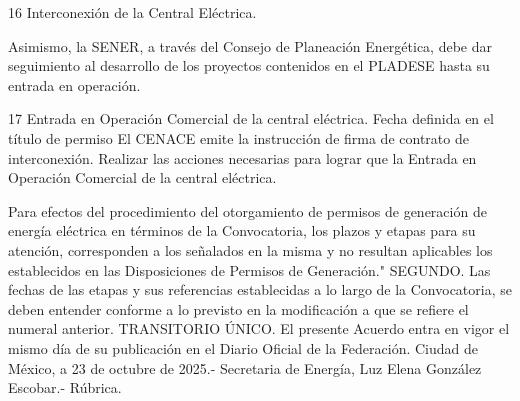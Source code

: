  16
 Interconexión de la Central Eléctrica.
 
 Asimismo, la SENER, a través del Consejo de Planeación Energética, debe dar seguimiento al desarrollo de los proyectos contenidos en el PLADESE hasta su entrada en operación.
 
 
 17
 Entrada en Operación Comercial de la central eléctrica.
 Fecha definida en el título de permiso
 El CENACE emite la instrucción de firma de contrato de interconexión.
 Realizar las acciones necesarias para lograr que la Entrada en Operación Comercial de la central eléctrica.
 
 
Para efectos del procedimiento del otorgamiento de permisos de generación de energía eléctrica en términos de la Convocatoria, los plazos y etapas para su atención, corresponden a los señalados en la misma y no resultan aplicables los establecidos en las Disposiciones de Permisos de Generación."
SEGUNDO. Las fechas de las etapas y sus referencias establecidas a lo largo de la Convocatoria, se deben entender conforme a lo previsto en la modificación a que se refiere el numeral anterior.
TRANSITORIO
ÚNICO. El presente Acuerdo entra en vigor el mismo día de su publicación en el Diario Oficial de la Federación.
Ciudad de México, a 23 de octubre de 2025.- Secretaria de Energía, Luz Elena González Escobar.- Rúbrica.\par
\endgroup

